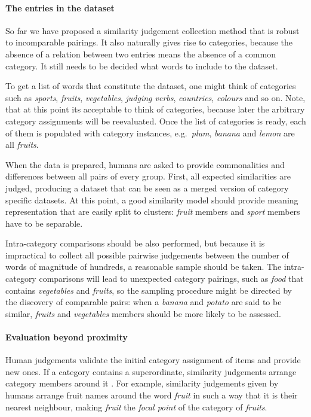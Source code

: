 \documentclass[11pt]{article}
\begin{document}
\paragraph{The entries in the dataset}

So far we have proposed a similarity judgement collection method that is robust to incomparable pairings. It also naturally gives rise to categories, because the absence of a relation between two entries means the absence of a common category. It still needs to be decided what words to include to the dataset.

To get a list of words that constitute the dataset, one might think of categories such as \textit{sports}, \textit{fruits}, \textit{vegetables}, \textit{judging verbs}, \textit{countries}, \textit{colours} and so on. Note, that at this point its acceptable to think of categories, because later the arbitrary category assignments will be reevaluated. Once the list of categories is ready, each of them is populated with category instances, e.g.~\textit{plum}, \textit{banana} and \textit{lemon} are all \textit{fruits}.

When the data is prepared, humans are asked to provide commonalities and differences between all pairs of every group. First, all expected similarities are judged, producing a dataset that can be seen as a merged version of category specific datasets. At this point, a good similarity model should provide meaning representation that are easily split to clusters: \textit{fruit} members and \textit{sport} members have to be separable.

Intra-category comparisons should be also performed, but because it is impractical to collect all possible pairwise judgements between the number of words of magnitude of hundreds, a reasonable sample should be taken. The intra-category comparisons will lead to unexpected category pairings, such as \textit{food} that contains \textit{vegetables} and \textit{fruits}, so the sampling procedure might be directed by the discovery of comparable pairs: when a \textit{banana} and \textit{potato} are said to be similar, \textit{fruits} and \textit{vegetables} members should be more likely to be assessed.

\paragraph{Evaluation beyond proximity}

Human judgements validate the initial category assignment of items and provide new ones. If a category contains a superordinate, similarity judgements arrange category members around it \cite{1986-13502-00119860101}. For example, similarity judgements given by humans arrange fruit names around the word \textit{fruit} in such a way that it is their nearest neighbour, making \textit{fruit} the \emph{focal point} of the category of \textit{fruits}.
\end{document}
